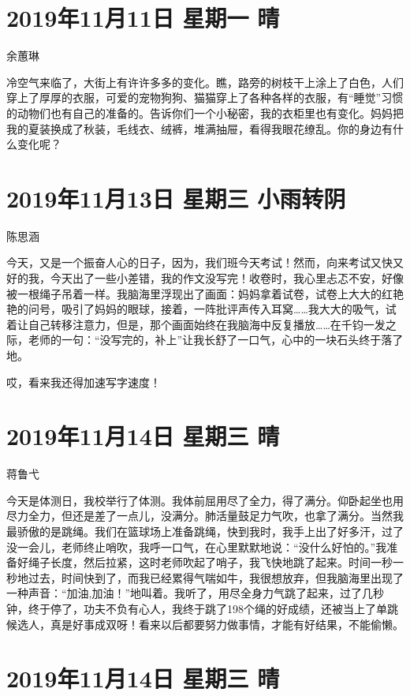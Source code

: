 \section{2019年11月11日 星期一 晴}

余蕙琳

冷空气来临了，大街上有许许多多的变化。瞧，路旁的树枝干上涂上了白色，人们穿上了厚厚的衣服，可爱的宠物狗狗、猫猫穿上了各种各样的衣服，有``睡觉''习惯的动物们也有自己的准备的。告诉你们一个小秘密，我的衣柜里也有变化。妈妈把我的夏装换成了秋装，毛线衣、绒裤，堆满抽屉，看得我眼花缭乱。你的身边有什么变化呢？

\section{2019年11月13日 星期三 小雨转阴}

陈思涵

今天，又是一个振奋人心的日子，因为，我们班今天考试！然而，向来考试又快又好的我，今天出了一些小差错，我的作文没写完！收卷时，我心里忐忑不安，好像被一根绳子吊着一样。我脑海里浮现出了画面：妈妈拿着试卷，试卷上大大的红艳艳的问号，吸引了妈妈的眼球，接着，一阵批评声传入耳窝\ldots\ldots 我大大的吸气，试着让自己转移注意力，但是，那个画面始终在我脑海中反复播放\ldots\ldots 在千钧一发之际，老师的一句：``没写完的，补上''让我长舒了一口气，心中的一块石头终于落了地。

哎，看来我还得加速写字速度！

\section{2019年11月14日 星期三 晴}

蒋鲁弋

今天是体测日，我校举行了体测。我体前屈用尽了全力，得了满分。仰卧起坐也用尽力全力，但还是差了一点儿，没满分。肺活量鼓足力气吹，也拿了满分。当然我最骄傲的是跳绳。我们在篮球场上准备跳绳，快到我时，我手上出了好多汗，过了没一会儿，老师终止哨吹，我呼一口气，在心里默默地说：``没什么好怕的。''我准备好绳子长度，然后拉紧，这时老师吹起了哨子，我飞快地跳了起来。时间一秒一秒地过去，时间快到了，而我已经累得气喘如牛，我很想放弃，但我脑海里出现了一种声音：``加油,加油！''地叫着。我听了，用尽全身力气跳了起来，过了几秒钟，终于停了，功夫不负有心人，我终于跳了198个绳的好成绩，还被当上了单跳候选人，真是好事成双呀！看来以后都要努力做事情，才能有好结果，不能偷懒。

\section{2019年11月14日 星期三 晴}

